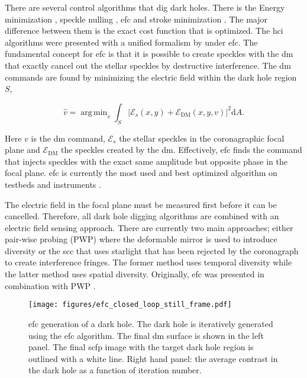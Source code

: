 \documentclass[letterpaper]{ar-1col}
\DeclareMathOperator*{\argmin}{arg\,min}
\begin{document}
There are several control algorithms that dig dark holes.
%
There is the Energy minimization \citep{borde2006high}, speckle nulling \citep{martinache2012speckle, martinache2014sky}, \acl{efc} \citep[\acs{efc}; ][]{Giveon09} and stroke minimization \citep{pueyo2009optimal}.
%
The major difference between them is the exact cost function that is optimized.
%
The \ac{hci} algorithms were presented with a unified formalism by \citet{Giveon09,Giveon10} under \ac{efc}.
%
The fundamental concept for \ac{efc} is that it is possible to create speckles with the \ac{dm} that exactly cancel out the stellar speckles by destructive interference.
%
The \ac{dm} commands are found by minimizing the electric field within the dark hole region $S$,

\begin{equation}
    \hat{v} = \argmin_v \int_S |\mathcal{E}_{s}(x,y) + \mathcal{E}_{\mathrm{DM}}(x, y, v)|^2\mathrm{d}A.
\end{equation}

Here $v$ is the \ac{dm} command, $\mathcal{E}_{s}$ the stellar speckles in the coronagraphic focal plane and $\mathcal{E}_{\mathrm{DM}}$ the speckles created by the \ac{dm}.
%
Effectively, \ac{efc} finds the command that injects speckles with the exact same amplitude but opposite phase in the focal plane.
%
\ac{efc} is currently the most used and best optimized algorithm on testbeds and instruments \citep{Mennesson24}.

The electric field in the focal plane must be measured first before it can be cancelled.
%
Therefore, all dark hole digging algorithms are combined with an electric field sensing approach.
%
There are currently two main approaches; either pair-wise probing (PWP) where the deformable mirror is used to introduce diversity or the \ac{scc} that uses starlight that has been rejected by the coronagraph to create interference fringes.
%
The former method uses temporal diversity while the latter method uses spatial diversity.
%
Originally, \ac{efc} was presented in combination with PWP \citep{Giveon09}.

\begin{figure}[ht]
  \centering
  \texttt{[image: figures/efc\_closed\_loop\_still\_frame.pdf]}
  \caption{\ac{efc} generation of a dark hole.
  The dark hole is iteratively generated using the \ac{efc} algorithm.
The final \ac{dm} surface is shown in the left panel.
%
The final \ac{scfp} image with the target dark hole region is outlined with a white line.
%
Right hand panel: the average contrast in the dark hole as a function of iteration number.}
  \label{fig:efc_darkhole}
\end{figure}
\end{document}
